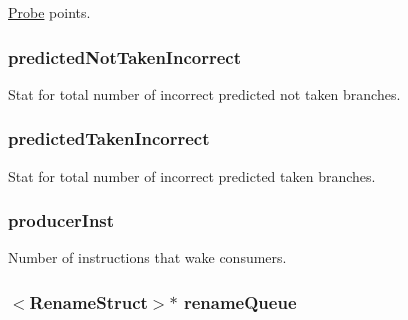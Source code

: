 \label{classDefaultIEW_a78ed80917b5ebd419bf614b2e3b8f2cb}
\hyperlink{namespaceProbe}{Probe} points. \hypertarget{classDefaultIEW_ae1cc96638781ca35cb92a5606bd508b7}{
\subsubsection[{predictedNotTakenIncorrect}]{ {\bf predictedNotTakenIncorrect}}}
\label{classDefaultIEW_ae1cc96638781ca35cb92a5606bd508b7}
Stat for total number of incorrect predicted not taken branches. \hypertarget{classDefaultIEW_aa848feac8bfb4947ca3acb410bfe75c6}{
\subsubsection[{predictedTakenIncorrect}]{ {\bf predictedTakenIncorrect}}}
\label{classDefaultIEW_aa848feac8bfb4947ca3acb410bfe75c6}
Stat for total number of incorrect predicted taken branches. \hypertarget{classDefaultIEW_a79df9c76c4c8c7da92694a4a571d44f0}{
\subsubsection[{producerInst}]{ {\bf producerInst}}}
\label{classDefaultIEW_a79df9c76c4c8c7da92694a4a571d44f0}
Number of instructions that wake consumers. \hypertarget{classDefaultIEW_ae9b536282159ba75153a223be77515ba}{
\subsubsection[{renameQueue}]{$<${\bf RenameStruct}$>$$\ast$ {\bf renameQueue}}}
